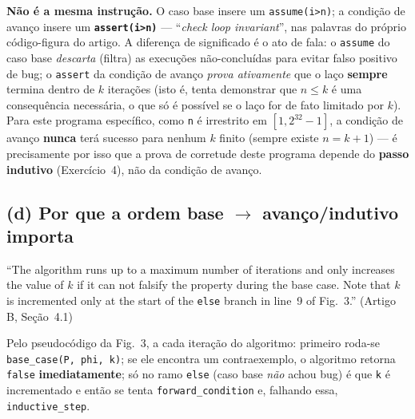 \documentclass[12pt,a4paper]{article}
\newcommand{\vv}[1]{\texttt{#1}}
\begin{document}
\begin{tcolorbox}[resultbox]
\textbf{N\~ao \'e a mesma instru\c{c}\~ao.} O caso base insere um \vv{assume(i>n)}; a
condi\c{c}\~ao de avan\c{c}o insere um \textbf{\vv{assert(i>n)}} --- ``\emph{check loop
invariant}'', nas palavras do pr\'oprio c\'odigo-figura do artigo. A diferen\c{c}a de
significado \'e o ato de fala: o \vv{assume} do caso base \emph{descarta} (filtra) as
execu\c{c}\~oes n\~ao-conclu\'idas para evitar falso positivo de bug; o \vv{assert} da
condi\c{c}\~ao de avan\c{c}o \emph{prova ativamente} que o la\c{c}o \textbf{sempre} termina
dentro de $k$ itera\c{c}\~oes (isto \'e, tenta demonstrar que $n\le k$ \'e uma consequ\^encia
necess\'aria, o que s\'o \'e poss\'ivel se o la\c{c}o for de fato limitado por $k$). Para este
programa espec\'ifico, como \vv{n} \'e irrestrito em $[1,2^{32}-1]$, a condi\c{c}\~ao de
avan\c{c}o \textbf{nunca} ter\'a sucesso para nenhum $k$ finito (sempre existe $n=k+1$) --- \'e
precisamente por isso que a prova de corretude deste programa depende do \textbf{passo
indutivo} (Exerc\'icio~4), n\~ao da condi\c{c}\~ao de avan\c{c}o.
\end{tcolorbox}

\subsection{(d) Por que a ordem base $\to$ avanço/indutivo importa}

\begin{tcolorbox}[quotebox]
``The algorithm runs up to a maximum number of iterations and only increases the value of $k$
if it can not falsify the property during the base case. Note that $k$ is incremented only at
the start of the \texttt{else} branch in line~9 of Fig.~3.'' (Artigo B, Se\c{c}\~ao~4.1)
\end{tcolorbox}

Pelo pseudoc\'odigo da Fig.~3, a cada itera\c{c}\~ao do algoritmo: primeiro roda-se
\vv{base\_case(P, phi, k)}; se ele encontra um contraexemplo, o algoritmo retorna
\vv{false} \textbf{imediatamente}; s\'o no ramo \vv{else} (caso base \emph{n\~ao} achou bug)
\'e que \vv{k} \'e incrementado e ent\~ao se tenta \vv{forward\_condition} e, falhando essa,
\vv{inductive\_step}.
\end{document}
